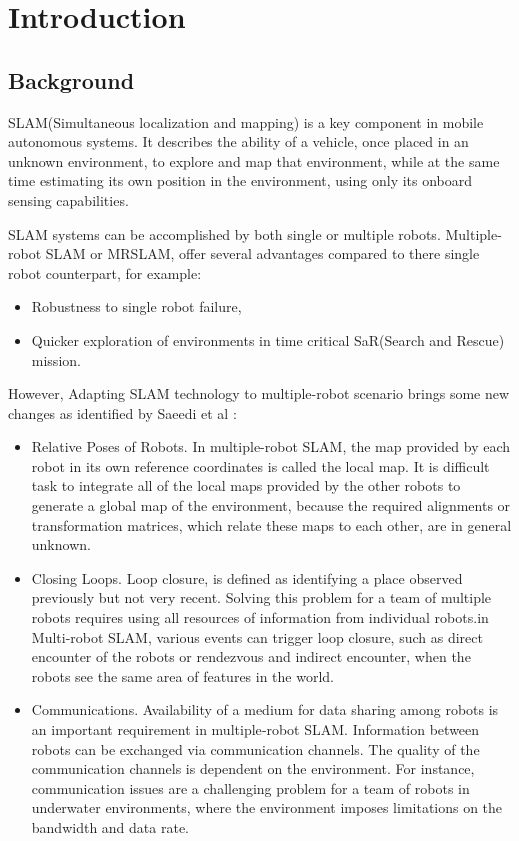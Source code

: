 
\chapter{Introduction}

\section{Background}

SLAM(Simultaneous localization and mapping) is a key component in mobile autonomous systems. It describes the ability of a vehicle, once placed in an unknown environment, to explore and map that environment, while at the same time estimating its own position in the environment, using only its onboard sensing capabilities.

SLAM systems can be accomplished by both single or multiple robots. Multiple-robot SLAM or MRSLAM, offer several advantages compared to there single robot counterpart, for example:
\begin{itemize}
	\item Robustness to single robot failure,
	\item Quicker exploration of environments in time critical SaR(Search and Rescue) mission.
\end{itemize} 


However, Adapting SLAM technology to multiple-robot scenario brings some new changes as identified by Saeedi et al \cite{saeedi2016multiple}:
\begin{itemize}
	\item Relative Poses of Robots. In multiple-robot SLAM, the map provided by each robot in its own reference coordinates is called the local map. It is difficult task to integrate all of the local maps provided by the other robots to generate a global map of the environment, because the required alignments or transformation matrices, which relate these maps to each other, are in general unknown.
	\item Closing Loops. Loop closure, is defined as identifying a place observed previously but not very recent. Solving this problem for a team of multiple robots requires using all resources of information from individual robots.in Multi-robot SLAM, various events can trigger loop closure, such as direct encounter of the robots or rendezvous and indirect encounter, when the robots see the same area of features in the world.
	\item Communications. Availability of a medium for data sharing among robots is an important requirement in multiple‐robot SLAM. Information between robots can be exchanged via communication channels. The quality of the communication channels is dependent on the environment. For instance, communication issues are a challenging problem for a team of robots in underwater environments, where the environment imposes limitations on the bandwidth and data rate.
\end{itemize}

